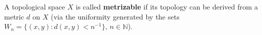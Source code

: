 A topological space $X$ is called \textbf{metrizable} if its topology can be derived from a metric $d$ on $X$ (via the uniformity generated by the sets $W_n = \{(x,y) : d(x,y) < n^{-1}\}$, $n \in \mathbb{N}$).
